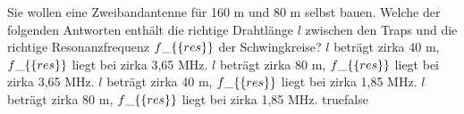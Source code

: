     {Sie wollen eine Zweibandantenne für 160 m und 80 m selbst bauen. Welche der folgenden Antworten enthält die richtige Drahtlänge $l$ zwischen den Traps und die richtige Resonanzfrequenz $f\_\{\textrm\{res\}\}$ der Schwingkreise?}
    {$l$ beträgt zirka 40 m, $f\_\{\textrm\{res\}\}$ liegt bei zirka 3,65 MHz.}
    {$l$ beträgt zirka 80 m, $f\_\{\textrm\{res\}\}$ liegt bei zirka 3,65 MHz.}
    {$l$ beträgt zirka 40 m, $f\_\{\textrm\{res\}\}$ liegt bei zirka 1,85 MHz.}
    {$l$ beträgt zirka 80 m, $f\_\{\textrm\{res\}\}$ liegt bei zirka 1,85 MHz.}
    {true}{false}